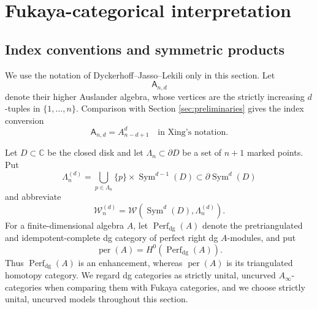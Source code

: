 \documentclass[12pt,a4paper,english,reqno]{amsart}
\theoremstyle{plain}
\theoremstyle{definition}
\newcommand{\perf}{\operatorname{per}}
\newcommand{\Wcat}{\mathcal W}
\begin{document}
\section{Fukaya-categorical interpretation}
\label{sec:fukaya}

\subsection{Index conventions and symmetric products}

We use the notation of Dyckerhoff--Jasso--Lekili \cite{DJL} only in this
section.  Let
\[
 \mathsf A_{n,d}
\]
denote their higher Auslander algebra, whose vertices are the strictly
increasing $d$-tuples in $\{1,\ldots,n\}$.  Comparison with Section 
\ref{sec:preliminaries} gives the index conversion
\begin{equation}
 \mathsf A_{n,d}=A_{n-d+1}^{d}
 \quad\text{in Xing's notation}.
\label{eq:DJL-index}
\end{equation}

Let $D\subset\mathbb C$ be the closed disk and let
$\Lambda_n\subset\partial D$ be a set of $n+1$ marked points.  Put
\begin{equation}
 \Lambda_n^{(d)}
 =
 \bigcup_{p\in\Lambda_n}
 \{p\}\times\operatorname{Sym}^{d-1}(D)
 \subset\partial\operatorname{Sym}^{d}(D)
\label{eq:symmetric-stops}
\end{equation}
and abbreviate
\begin{equation}
\Wcat_n^{(d)}
 =
 \Wcat\!\left(\operatorname{Sym}^{d}(D),\Lambda_n^{(d)}\right).
\label{eq:W-nd}
\end{equation}
For a finite-dimensional algebra $A$, let
$\operatorname{Perf}_{\mathrm{dg}}(A)$ denote the pretriangulated and
idempotent-complete dg category of perfect right dg $A$-modules, and put
\begin{equation}
 \perf(A)=H^0\!\left(\operatorname{Perf}_{\mathrm{dg}}(A)\right).
\label{eq:enhanced-perf-convention}
\end{equation}
Thus $\operatorname{Perf}_{\mathrm{dg}}(A)$ is an enhancement, whereas
$\perf(A)$ is its triangulated homotopy category.  We regard dg categories
as strictly unital, uncurved $A_\infty$-categories when comparing them with
Fukaya categories, and we choose strictly unital, uncurved models throughout
this section.
\end{document}
